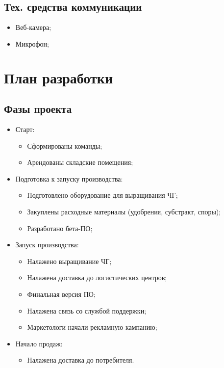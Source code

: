 \documentclass[a4paper,10pt]{article}
\begin{document}
\subsection{Тех. средства коммуникации}

    \begin{itemize}
        \item Веб-камера;
        \item Микрофон;
    \end{itemize}

\section{План разработки}

\subsection{Фазы проекта}

    \begin{itemize}
        \item Старт:
            \begin{itemize}
                \item Сформированы команды;
                \item Арендованы складские помещения;
            \end{itemize}

        \item Подготовка к запуску производства:
            \begin{itemize}
                \item Подготовлено оборудование для выращивания ЧГ;
                \item Закуплены расходные материалы (удобрения, субстракт, споры);
                \item Разработано бета-ПО;
            \end{itemize}


        \item Запуск производства:
            \begin{itemize}
            \item Налажено выращивание ЧГ;
            \item Налажена доставка до логистических центров;
            \item Финальная версия ПО;
            \item Налажена связь со службой поддержки;
            \item Маркетологи начали рекламную кампанию;
            \end{itemize}

        \item Начало продаж:
            \begin{itemize}
                \item Налажена доставка до потребителя.
            \end{itemize}

    \end{itemize}
\end{document}
